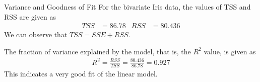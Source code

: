 \begin{frame}{Variance and Goodness of Fit}
    For the bivariate Iris data, the values of TSS and RSS are given as
    \begin{align*}
        TSS & = 86.78 & RSS & = 80.436
    \end{align*}
    We can observe that $TSS = SSE + RSS$.

	\medskip

    The fraction of variance explained by the model, that is, the $R^2$
    value, is given as
    \begin{align*}
        R^2 = \frac{RSS}{TSS} = \frac{80.436}{86.78} = 0.927
    \end{align*}
    This indicates a very good fit of the linear model.
\end{frame}
%
%
%
%
%
%
%
